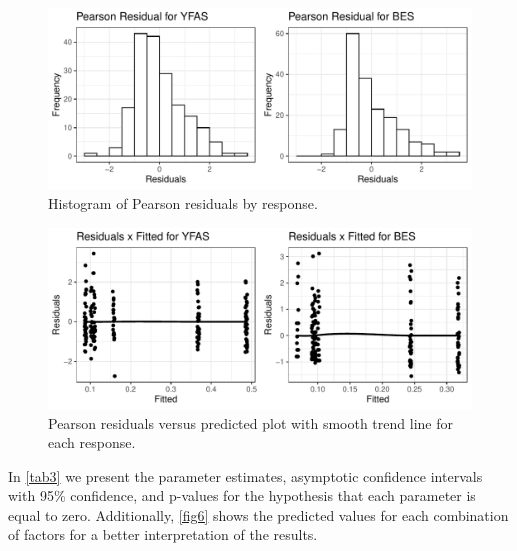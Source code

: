 \documentclass[AMA,STIX1COL]{WileyNJD-v2}
\begin{document}
\begin{figure}[h]
\centerline{\includegraphics[scale = 0.9]{FIGURE4}}
\caption{Histogram of Pearson residuals by response.\label{fig4}}
\end{figure}

\begin{figure}[h]
\centerline{\includegraphics[scale = 0.9]{FIGURE5}}
\caption{Pearson residuals versus predicted plot with smooth trend line for each response.\label{fig5}}
\end{figure}

In \autoref{tab3} we present the parameter estimates, asymptotic confidence intervals with 95\% confidence, and p-values for the hypothesis that each parameter is equal to zero. Additionally, \autoref{fig6} shows the predicted values for each combination of factors for a better interpretation of the results.
\end{document}
